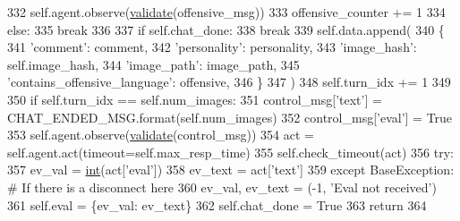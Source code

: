 \begin{DoxyCode}
332                     self.agent.observe(\hyperlink{namespaceparlai_1_1core_1_1worlds_afc3fad603b7bce41dbdc9cdc04a9c794}{validate}(offensive\_msg))
333                     offensive\_counter += 1
334                 \textcolor{keywordflow}{else}:
335                     \textcolor{keywordflow}{break}
336 
337             \textcolor{keywordflow}{if} self.chat\_done:
338                 \textcolor{keywordflow}{break}
339             self.data.append(
340                 \{
341                     \textcolor{stringliteral}{'comment'}: comment,
342                     \textcolor{stringliteral}{'personality'}: personality,
343                     \textcolor{stringliteral}{'image\_hash'}: self.image\_hash,
344                     \textcolor{stringliteral}{'image\_path'}: image\_path,
345                     \textcolor{stringliteral}{'contains\_offensive\_language'}: offensive,
346                 \}
347             )
348             self.turn\_idx += 1
349 
350         \textcolor{keywordflow}{if} self.turn\_idx == self.num\_images:
351             control\_msg[\textcolor{stringliteral}{'text'}] = CHAT\_ENDED\_MSG.format(self.num\_images)
352             control\_msg[\textcolor{stringliteral}{'eval'}] = \textcolor{keyword}{True}
353             self.agent.observe(\hyperlink{namespaceparlai_1_1core_1_1worlds_afc3fad603b7bce41dbdc9cdc04a9c794}{validate}(control\_msg))
354             act = self.agent.act(timeout=self.max\_resp\_time)
355             self.check\_timeout(act)
356             \textcolor{keywordflow}{try}:
357                 ev\_val = \hyperlink{namespacelanguage__model_1_1eval__ppl_a7d12ee00479673c5c8d1f6d01faa272a}{int}(act[\textcolor{stringliteral}{'eval'}])
358                 ev\_text = act[\textcolor{stringliteral}{'text'}]
359             \textcolor{keywordflow}{except} BaseException:  \textcolor{comment}{# If there is a disconnect here}
360                 ev\_val, ev\_text = (-1, \textcolor{stringliteral}{'Eval not received'})
361             self.eval = \{ev\_val: ev\_text\}
362         self.chat\_done = \textcolor{keyword}{True}
363         \textcolor{keywordflow}{return}
364 
\end{DoxyCode}
\mbox{\label{classpersonality__captions_1_1worlds_1_1MTurkPersonalityCaptionsWorld_a1fe4b499c8d38e26df4a7921a1672c32}} 
